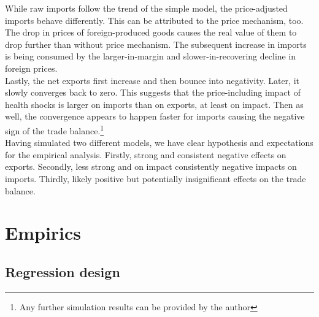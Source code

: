 \documentclass{article}
\begin{document}
While raw imports follow the trend of the simple model, the price-adjusted imports behave differently. This can be attributed to the price mechanism, too. The drop in prices of foreign-produced goods causes the real value of them to drop further than without price mechanism. The subsequent increase in imports is being consumed by the larger-in-margin and slower-in-recovering decline in foreign prices. \\
Lastly, the net exports first increase and then bounce into negativity. Later, it slowly converges back to zero. This suggests that the price-including impact of health shocks is larger on imports than on exports, at least on impact. Then as well, the convergence appears to happen faster for imports causing the negative sign of the trade balance.\footnote{Any further simulation results can be provided by the author}\\
Having simulated two different models, we have clear hypothesis and expectations for the empirical analysis. Firstly, strong and consistent negative effects on exports. Secondly, less strong and on impact consistently negative impacts on imports. Thirdly, likely positive but potentially insignificant effects on the trade balance.

\section{Empirics}

\subsection{Regression design}
\end{document}
